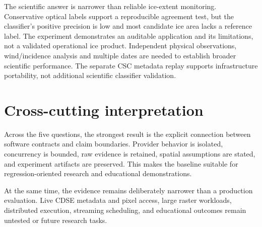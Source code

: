 The scientific answer is narrower than reliable ice-extent monitoring. Conservative
optical labels support a reproducible agreement test, but the classifier's positive
precision is low and most candidate ice area lacks a reference label. The experiment
demonstrates an auditable application and its limitations, not a validated operational
ice product. Independent physical observations, wind/incidence analysis and multiple dates
are needed to establish broader scientific performance. The separate CSC metadata replay
supports infrastructure portability, not additional scientific classifier validation.

\section{Cross-cutting interpretation}

Across the five questions, the strongest result is the explicit connection between software contracts and claim boundaries. Provider behavior is isolated, concurrency is bounded, raw evidence is retained, spatial assumptions are stated, and experiment artifacts are preserved. This makes the baseline suitable for regression-oriented research and educational demonstrations.

At the same time, the evidence remains deliberately narrower than a production evaluation.
Live CDSE metadata and pixel access, large raster workloads, distributed execution, streaming
scheduling, and educational outcomes remain untested or future research tasks.
